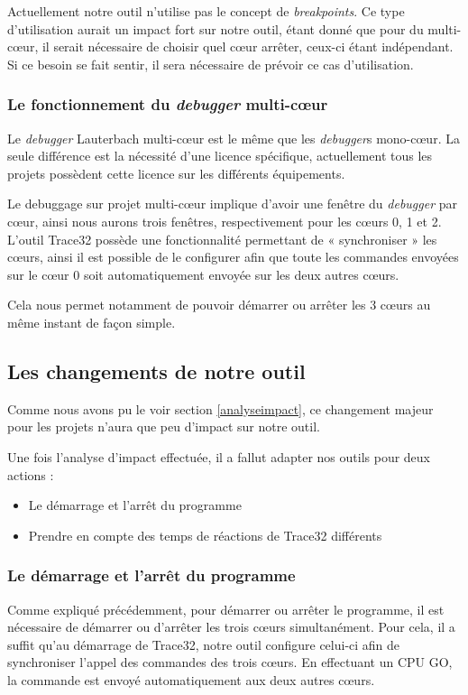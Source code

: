 \begin{remarque}
Actuellement notre outil n'utilise pas le concept de \textit{breakpoints}. Ce type d'utilisation aurait un impact fort sur notre outil, étant donné que pour du multi-cœur, il serait nécessaire de choisir quel c\oe{}ur arrêter, ceux-ci étant indépendant. Si ce besoin se fait sentir, il sera nécessaire de prévoir ce cas d'utilisation.
\end{remarque}

\subsubsection{Le fonctionnement du \textit{debugger} multi-cœur}
Le \textit{debugger} Lauterbach multi-cœur est le même que les \textit{debugger}s mono-cœur. La seule différence est la nécessité d'une licence spécifique, actuellement tous les projets possèdent cette licence sur les différents équipements. 

Le debuggage sur projet multi-cœur implique d'avoir une fenêtre du \textit{debugger} par cœur, ainsi nous aurons trois fenêtres, respectivement pour les cœurs 0, 1 et 2. L'outil Trace32 possède une fonctionnalité permettant de « synchroniser » les cœurs, ainsi il est possible de le configurer afin que toute les commandes envoyées sur le cœur 0 soit automatiquement envoyée sur les deux autres cœurs. 

Cela nous permet notamment de pouvoir démarrer ou arrêter les 3 c\oe{}urs au même instant de façon simple. 

\subsection{Les changements de notre outil}
Comme nous avons pu le voir section \ref{analyseimpact}, ce changement majeur pour les projets n'aura que peu d'impact sur notre outil.

Une fois l'analyse d'impact effectuée, il a fallut adapter nos outils pour deux actions : 
\begin{itemize}
	\item Le démarrage et l'arrêt du programme
	\item Prendre en compte des temps de réactions de Trace32 différents
\end{itemize} 

\subsubsection{Le démarrage et l'arrêt du programme}
Comme expliqué précédemment, pour démarrer ou arrêter le programme, il est nécessaire de démarrer ou d'arrêter les trois cœurs simultanément. Pour cela, il a suffit qu'au démarrage de Trace32, notre outil configure celui-ci afin de synchroniser l'appel des commandes des trois cœurs. En effectuant un CPU GO, la commande est envoyé automatiquement aux deux autres cœurs.

